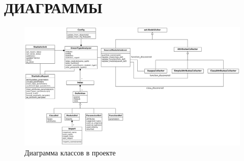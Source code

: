 \chapter{ДИАГРАММЫ}
\label{app:diagrams}

\begin{turn}{90}
\begin{minipage}{0.69\paperheight}
\begin{figure}[H]
  \centering
  \includegraphics[width=\textwidth]{fig/classes-diag.png}
  \caption{Диаграмма классов в проекте}
  \label{fig:classes-diag}
\end{figure}
\end{minipage}
\end{turn}



